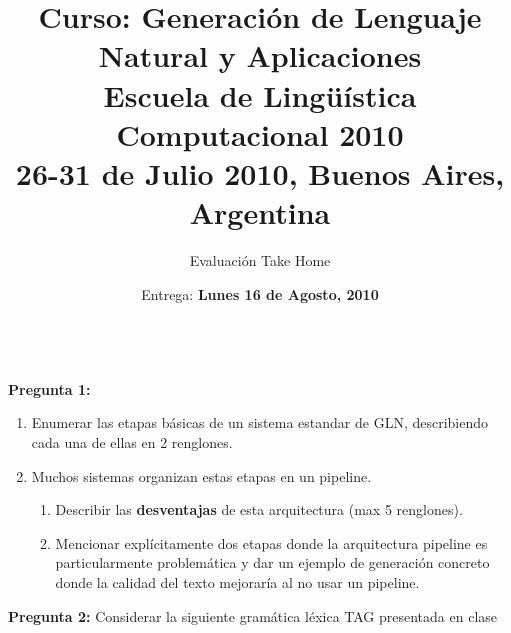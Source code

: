 \documentclass{article}
\title{\textsf{Curso: Generaci\'on de Lenguaje Natural y Aplicaciones}\\
Escuela de Ling\"u\'istica Computacional 2010 \\
26-31 de Julio 2010, Buenos Aires, Argentina\\
}
\author{Evaluaci\'on Take Home}
\date{Entrega: \textbf{Lunes 16 de Agosto, 2010}\\
\mbox{    } }
\begin{document}
\maketitle



\textbf{Pregunta 1: } 
\begin{enumerate}
\item Enumerar las etapas b\'asicas de un sistema estandar 
de GLN, describiendo cada una de ellas en 2 renglones. 
\item Muchos sistemas organizan
estas etapas en un pipeline. 
\begin{enumerate}
\item Describir las \textbf{desventajas} de esta 
arquitectura (max 5 renglones).  

\item Mencionar expl\'icitamente dos etapas donde la arquitectura 
pipeline es particularmente problem\'atica y dar un ejemplo de generaci\'on 
concreto donde la calidad del texto mejorar\'ia al no usar un pipeline. 
  
\end{enumerate}
\end{enumerate}

\medskip
\textbf{Pregunta 2: } 
Considerar la siguiente gram\'atica l\'exica TAG presentada en clase
\end{document}
